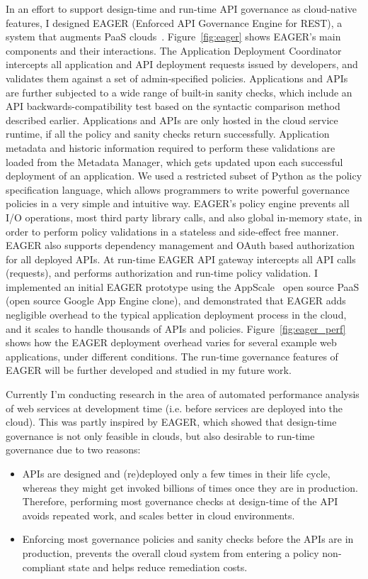 In an effort to support design-time and run-time API governance as cloud-native features, 
I designed EAGER (Enforced API Governance Engine for REST), a 
system that augments PaaS clouds~\cite{6903538}. 
Figure~\ref{fig:eager}  shows EAGER's main components and their interactions.
The Application Deployment Coordinator intercepts all application and API 
deployment requests issued by developers, and validates them against a set of 
admin-specified policies. Applications and APIs are further subjected to a wide 
range of built-in sanity checks, which include an API backwards-compatibility test based 
on the syntactic comparison method described earlier. Applications and APIs are only 
hosted in the cloud service runtime, if all the policy and sanity checks return successfully.
Application metadata and historic information required to perform these validations are 
loaded from the Metadata Manager, which gets updated upon each successful deployment
of an application. 
We used a 
restricted subset of Python as the policy specification language, which allows programmers 
to write powerful governance policies in a very simple and intuitive way. EAGER's policy engine 
prevents all I/O operations, most third party library calls, and also global in-memory state, in 
order to perform policy validations in a stateless and side-effect free manner. EAGER also 
supports dependency management and OAuth based authorization for all deployed APIs. 
At run-time EAGER API gateway
intercepts all API calls (requests), and performs authorization and run-time policy validation.
I implemented an initial EAGER 
prototype using the AppScale~\cite{krintzappscale13} open source PaaS (open source Google App Engine clone), 
and demonstrated that EAGER adds negligible overhead to the typical application deployment 
process in the cloud, and it scales to handle thousands of APIs and policies. Figure~\ref{fig:eager_perf}
shows how the EAGER deployment overhead varies for several example web applications, under different
conditions. The run-time governance features of EAGER will be further developed and studied in
my future work.

Currently I'm conducting research in the area of automated performance analysis of web
services at development time (i.e. before services are deployed into the cloud). This was
partly inspired by EAGER, which showed that design-time governance
is not only feasible in clouds, but also desirable to run-time governance due to two reasons:

\begin{itemize}
\item APIs are designed and (re)deployed only a few times in their life cycle, whereas they might
get invoked billions of times once they are in production. Therefore, performing most governance
checks at design-time of the API avoids repeated work, and scales better in cloud environments.
\item Enforcing most governance policies and sanity checks before the APIs are in production,
prevents the overall cloud system from entering a policy non-compliant state and helps reduce
remediation costs.
\end{itemize}

